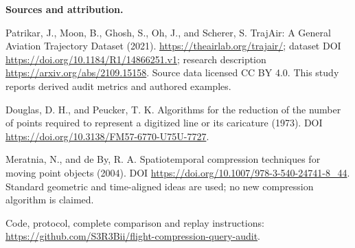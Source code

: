 \documentclass[11pt]{article}
\begin{document}
\textbf{Sources and attribution.}\par
\small
Patrikar, J., Moon, B., Ghosh, S., Oh, J., and Scherer, S. TrajAir: A General Aviation Trajectory Dataset (2021). \url{https://theairlab.org/trajair/}; dataset DOI \url{https://doi.org/10.1184/R1/14866251.v1}; research description \url{https://arxiv.org/abs/2109.15158}. Source data licensed CC BY 4.0. This study reports derived audit metrics and authored examples.\par
Douglas, D. H., and Peucker, T. K. Algorithms for the reduction of the number of points required to represent a digitized line or its caricature (1973). DOI \url{https://doi.org/10.3138/FM57-6770-U75U-7727}.\par
Meratnia, N., and de By, R. A. Spatiotemporal compression techniques for moving point objects (2004). DOI \url{https://doi.org/10.1007/978-3-540-24741-8_44}. Standard geometric and time-aligned ideas are used; no new compression algorithm is claimed.\par
Code, protocol, complete comparison and replay instructions: \url{https://github.com/S3R3Bii/flight-compression-query-audit}.
\end{document}
